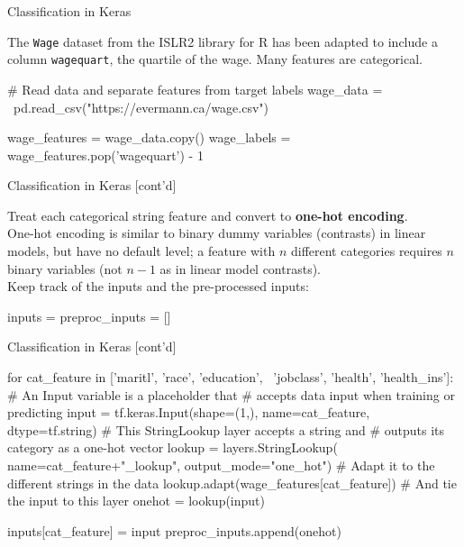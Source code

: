 \documentclass[ignorenonframetext,xcolor=x11names]{beamer}
\begin{document}
\begin{frame}[label=withcode,fragile]{Classification in Keras}

The \texttt{Wage} dataset from the ISLR2 library for R has been adapted to include a column \texttt{wagequart}, the quartile of the wage. Many features are categorical.

\begin{pythoncode}
# Read data and separate features from target labels
wage_data = \
    pd.read_csv("https://evermann.ca/wage.csv")
    
wage_features = wage_data.copy()
wage_labels = wage_features.pop('wagequart') - 1
\end{pythoncode}
\end{frame}

\begin{frame}[label=withcode,fragile]{Classification in Keras \small [cont'd]}

Treat each categorical string feature and convert to \textbf{one-hot encoding}. \\

One-hot encoding is similar to binary dummy variables (contrasts) in linear models, but have no default level; a feature with $n$ different categories requires $n$ binary variables (not $n-1$ as in linear model contrasts). \\

Keep track of the inputs and the pre-processed inputs:
\begin{pythoncode}
inputs = {}
preproc_inputs = []
\end{pythoncode}
\end{frame}

\begin{frame}[label=withcode,fragile]{Classification in Keras \small [cont'd]}
\begin{pythoncode}
for cat_feature in ['maritl', 'race', 'education', \
               'jobclass', 'health', 'health_ins']:
    # An Input variable is a placeholder that
    # accepts data input when training or predicting
    input = tf.keras.Input(shape=(1,), 
                           name=cat_feature, 
                           dtype=tf.string)
    # This StringLookup layer accepts a string and 
    # outputs its category as a one-hot vector
    lookup = layers.StringLookup(
        name=cat_feature+"_lookup",
        output_mode="one_hot")
    # Adapt it to the different strings in the data
    lookup.adapt(wage_features[cat_feature])
    # And tie the input to this layer
    onehot = lookup(input)
    
    inputs[cat_feature] = input
    preproc_inputs.append(onehot)
\end{pythoncode}
\end{frame}
\end{document}
